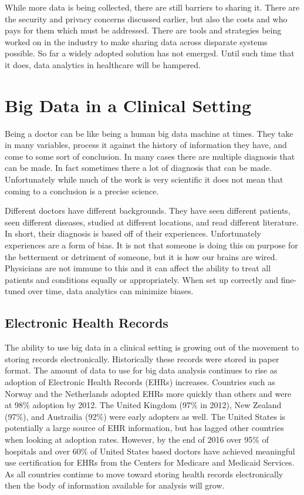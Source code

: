 \documentclass[sigconf]{acmart}
\begin{document}
While more data is being collected, there are still barriers to sharing 
it.  There are the security and privacy concerns discussed earlier, but 
also the costs and who pays for them which must be addressed.  There are 
tools and strategies being worked on in the industry to make sharing data 
across disparate systems possible.  So far a widely adopted solution has 
not emerged\cite{HCATop10}.  Until such time that it does, data analytics 
in healthcare will be hampered.

\section{Big Data in a Clinical Setting}
Being a doctor can be like being a human big data machine at times.  They 
take in many variables, process it against the history of information they 
have, and come to some sort of conclusion.  In many cases there are multiple 
diagnosis that can be made.  In fact sometimes there a lot of diagnosis that 
can be made.  Unfortunately while much of the work is very scientific it 
does not mean that coming to a conclusion is a precise science.  

Different doctors have different backgrounds.  They have seen different 
patients, seen different diseases, studied at different locations, and read 
different literature.  In short, their diagnosis is based off of their 
experiences.  Unfortunately experiences are a form of bias.  It is not that 
someone is doing this on purpose for the betterment or detriment of someone, 
but it is how our brains are wired.  Physicians are not immune to this and 
it can affect the ability to treat all patients and conditions equally or 
appropriately\cite{PMC3797360}.  When set up correctly and fine-tuned over 
time, data analytics can minimize biases.

\subsection{Electronic Health Records}
The ability to use big data in a clinical setting is growing out of the
movement to storing records electronically.  Historically these records 
were stored in paper format.  The amount of data to use for big data 
analysis continues to rise as adoption of Electronic Health Records 
(EHRs) increases.  Countries such as Norway and the Netherlands 
adopted EHRs more quickly than others and were at 98\% adoption by 2012.  
The United Kingdom (97\% in 2012), New Zealand (97\%), and Austrailia 
(92\%) were early adopters as well.\cite{BeckerEHR}  The United States 
is potentially a large source of EHR information, but has lagged other 
countries when looking at adoption rates.  However, by the end of 2016 
over 95\% of hospitals and over 60\% of United States based doctors 
have achieved meaningful use certification for EHRs from the Centers 
for Medicare and Medicaid Services.\cite{HITDashboard}  As all 
countries continue to move toward storing health records electronically 
then the body of information available for analysis will grow. 
\end{document}

